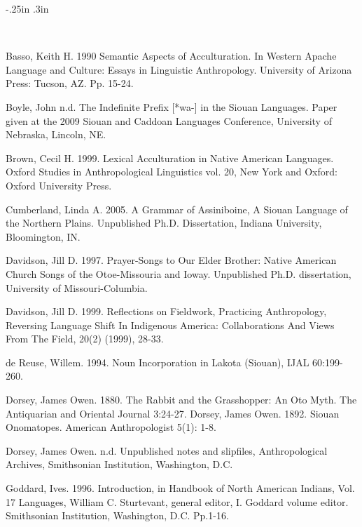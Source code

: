 \documentclass[output=paper]{LSP/langsci}
\begin{document}
\newenvironment{reflist} {\begin{list} {} {\listparindent -.25in
\leftmargin .3in} \item \ \vspace{-.3in} } {\end{list} }

\begin{reflist}

Basso, Keith  H. 1990  Semantic Aspects of Acculturation. In Western Apache Language and Culture: Essays in Linguistic Anthropology.  University of Arizona Press:  Tucson, AZ.  Pp. 15-24.   

Boyle, John n.d. The Indefinite Prefix [*wa-] in the Siouan Languages. Paper given at the 2009 Siouan and Caddoan Languages Conference, University of Nebraska, Lincoln, NE.             

Brown, Cecil H. 1999. Lexical Acculturation in Native American Languages.  Oxford Studies in Anthropological Linguistics vol. 20, New York and Oxford:  Oxford University Press. 	   

Cumberland, Linda A.  2005. A Grammar of Assiniboine, A Siouan Language of the Northern Plains.  Unpublished Ph.D. Dissertation, Indiana University, Bloomington, IN.   		   
      
Davidson, Jill D.  1997. Prayer-Songs to Our Elder Brother: Native American Church Songs of the Otoe-Missouria and Ioway. Unpublished Ph.D. dissertation, University of Missouri-Columbia. 	        

Davidson, Jill D. 1999.  Reflections on Fieldwork, Practicing Anthropology, Reversing Language Shift In Indigenous America: Collaborations And Views From The Field, 20(2) (1999), 28-33.  		 

de Reuse, Willem. 1994.  Noun Incorporation in Lakota (Siouan),  IJAL 60:199-260.  		  

Dorsey, James Owen. 1880. The Rabbit and the Grasshopper:  An Oto Myth. The Antiquarian and Oriental Journal 3:24-27.										   
Dorsey, James Owen. 1892.  Siouan Onomatopes. American Anthropologist 5(1): 1-8. 

Dorsey, James Owen. n.d.  Unpublished notes and slipfiles, Anthropological Archives, Smithsonian Institution, Washington, D.C.  

Goddard, Ives.  1996.  Introduction, in Handbook of North American Indians, Vol. 17 Languages, William C. Sturtevant, general editor, I. Goddard volume editor.  Smithsonian Institution, Washington, D.C.  Pp.1-16.  							     		                 


\end{reflist}
\end{document}
